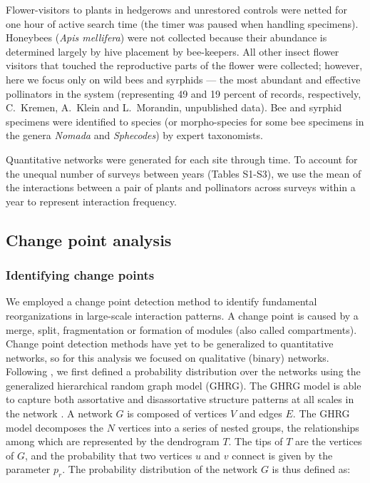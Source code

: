 \documentclass[12pt]{article}
\begin{document}
Flower-visitors to plants in hedgerows and unrestored controls were
netted for one hour of active search time (the timer was paused when
handling specimens). Honeybees (\textit{Apis mellifera}) were not
collected because their abundance is determined largely by hive
placement by bee-keepers. All other insect flower visitors that
touched the reproductive parts of the flower were collected; however,
here we focus only on wild bees and syrphids --- the most abundant and
effective pollinators in the system (representing 49 and 19 percent of
records, respectively, C.~Kremen, A.~Klein and L.~Morandin,
unpublished data). Bee and syrphid specimens were identified to
species (or morpho-species for some bee specimens in the genera
\textit{Nomada} and \textit{Sphecodes}) by expert taxonomists.

Quantitative networks were generated for each site through time. To
account for the unequal number of surveys between years (Tables
S1-S3), we use the mean of the interactions between a pair of plants
and pollinators across surveys within a year to represent interaction
frequency.

\subsection*{Change point analysis}
\subsubsection*{Identifying change points}
We employed a change point detection method \citep{peel2014detecting}
to identify fundamental reorganizations in large-scale interaction
patterns. A change point is caused by a merge, split, fragmentation or
formation of modules (also called compartments). Change point
detection methods have yet to be generalized to quantitative networks,
so for this analysis we focused on qualitative (binary)
networks. Following \cite{peel2014detecting}, we first defined a
probability distribution over the networks using the generalized
hierarchical random graph model (GHRG). The GHRG model is able to
capture both assortative and disassortative structure patterns at all
scales in the network \citep{peel2014detecting}. A network $G$ is
composed of vertices $V$ and edges $E$. The GHRG model decomposes the
$N$ vertices into a series of nested groups, the relationships among
which are represented by the dendrogram $T$. The tips of $T$ are the
vertices of $G$, and the probability that two vertices $u$ and $v$
connect is given by the parameter $p_r$. The probability distribution
of the network $G$ is thus defined as:
\end{document}
